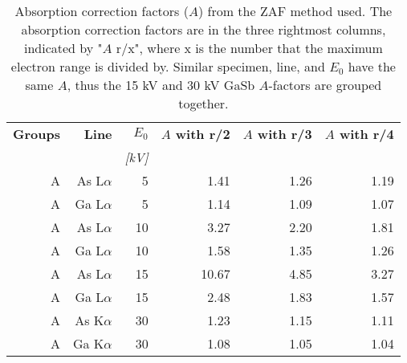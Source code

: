 \begin{table}[p]
    \begin{center}
        \caption{
            Absorption correction factors ($A$) from the ZAF method used.
            The absorption correction factors are in the three rightmost columns, indicated by "$A$ r/x", where x is the number that the maximum electron range is divided by.
            Similar specimen, line, and $E_0$ have the same $A$, thus the 15 kV and 30 kV GaSb $A$-factors are grouped together.
        }
        \label{tab:results:ZAF_corrections_factors}
        \begin{tabular}{rrrrrr}
            \hline
            \textbf{Groups} & \textbf{Line} & \textbf{$E_0$} & \textbf{$A$ with r/2} & \textbf{$A$ with r/3} & \textbf{$A$ with r/4} \\
            \emph{}         & \emph{}       & \emph{[kV]}    & \emph{}               & \emph{}               & \emph{}               \\
            \hline
            A               & As L$\alpha$  & 5              & 1.41                  & 1.26                  & 1.19                  \\
            A               & Ga L$\alpha$  & 5              & 1.14                  & 1.09                  & 1.07                  \\
            A               & As L$\alpha$  & 10             & 3.27                  & 2.20                  & 1.81                  \\
            A               & Ga L$\alpha$  & 10             & 1.58                  & 1.35                  & 1.26                  \\
            A               & As L$\alpha$  & 15             & 10.67                 & 4.85                  & 3.27                  \\
            A               & Ga L$\alpha$  & 15             & 2.48                  & 1.83                  & 1.57                  \\
            A               & As K$\alpha$  & 30             & 1.23                  & 1.15                  & 1.11                  \\
            A               & Ga K$\alpha$  & 30             & 1.08                  & 1.05                  & 1.04                  \\
            \hline

\end{tabular}
\end{center}
\end{table}
